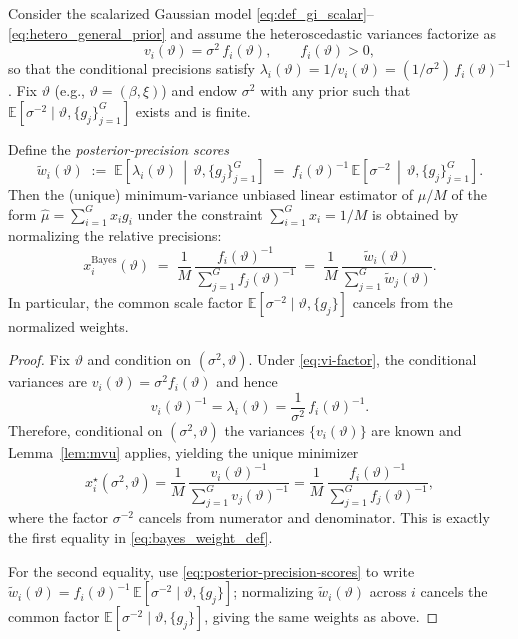 \begin{theorem}\label{thm:ppa}
Consider the scalarized Gaussian model \eqref{eq:def_gi_scalar}--\eqref{eq:hetero_general_prior} and assume
the heteroscedastic variances factorize as
\begin{equation}
  v_i(\vartheta)=\sigma^2\,f_i(\vartheta),
  \qquad f_i(\vartheta)>0,
  \label{eq:vi-factor}
\end{equation}
so that the conditional precisions satisfy $\lambda_i(\vartheta)=1/v_i(\vartheta)=(1/\sigma^2)\,f_i(\vartheta)^{-1}$.
Fix $\vartheta$ (e.g., $\vartheta=(\beta,\xi)$) and endow $\sigma^2$ with any prior such that
$\mathbb{E}[\sigma^{-2}\mid \vartheta,\{g_j\}_{j=1}^G]$ exists and is finite.

Define the \emph{posterior-precision scores}
\begin{equation}
  \widetilde{w}_i(\vartheta)
  \;:=\;
  \mathbb{E}\!\left[\lambda_i(\vartheta)\,\middle|\,\vartheta,\{g_j\}_{j=1}^G\right]
  \;=\;
  f_i(\vartheta)^{-1}\,\mathbb{E}\!\left[\sigma^{-2}\,\middle|\,\vartheta,\{g_j\}_{j=1}^G\right].
  \label{eq:posterior-precision-scores}
\end{equation}
Then the (unique) minimum-variance unbiased linear estimator of $\mu/M$ of the form
$\widehat{\mu}=\sum_{i=1}^G x_i g_i$ under the constraint $\sum_{i=1}^G x_i=1/M$ is obtained by
normalizing the relative precisions:
\begin{equation}
  x_i^{\mathrm{Bayes}}(\vartheta)
  \;=\;
  \frac{1}{M}\,\frac{f_i(\vartheta)^{-1}}{\sum_{j=1}^G f_j(\vartheta)^{-1}}
  \;=\;
  \frac{1}{M}\,\frac{\widetilde{w}_i(\vartheta)}{\sum_{j=1}^G \widetilde{w}_j(\vartheta)}.
  \label{eq:bayes_weight_def}
\end{equation}
In particular, the common scale factor $\mathbb{E}[\sigma^{-2}\mid\vartheta,\{g_j\}]$ cancels from the normalized weights.
\end{theorem}

\begin{proof}
Fix $\vartheta$ and condition on $(\sigma^2,\vartheta)$.
Under \eqref{eq:vi-factor}, the conditional variances are $v_i(\vartheta)=\sigma^2 f_i(\vartheta)$ and hence
\[
v_i(\vartheta)^{-1}=\lambda_i(\vartheta)=\frac{1}{\sigma^2}\,f_i(\vartheta)^{-1}.
\]
Therefore, conditional on $(\sigma^2,\vartheta)$ the variances $\{v_i(\vartheta)\}$ are known and
Lemma~\ref{lem:mvu} applies, yielding the unique minimizer
\[
x_i^\star(\sigma^2,\vartheta)
=\frac{1}{M}\,\frac{v_i(\vartheta)^{-1}}{\sum_{j=1}^G v_j(\vartheta)^{-1}}
=\frac{1}{M}\,\frac{f_i(\vartheta)^{-1}}{\sum_{j=1}^G f_j(\vartheta)^{-1}},
\]
where the factor $\sigma^{-2}$ cancels from numerator and denominator.
This is exactly the first equality in \eqref{eq:bayes_weight_def}.

For the second equality, use \eqref{eq:posterior-precision-scores} to write
$\widetilde w_i(\vartheta)=f_i(\vartheta)^{-1}\,\mathbb{E}[\sigma^{-2}\mid\vartheta,\{g_j\}]$;
normalizing $\widetilde w_i(\vartheta)$ across $i$ cancels the common factor
$\mathbb{E}[\sigma^{-2}\mid\vartheta,\{g_j\}]$, giving the same weights as above.
\end{proof}

